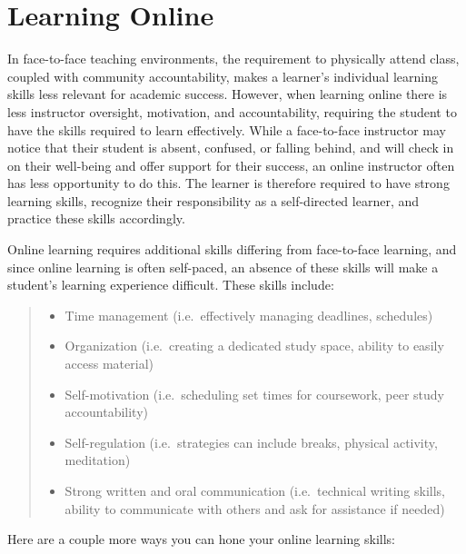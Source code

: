 \documentclass[
]{book}
\providecommand{\tightlist}{%
  \setlength{\itemsep}{0pt}\setlength{\parskip}{0pt}}
\theoremstyle{definition}
\theoremstyle{definition}
\theoremstyle{definition}
\theoremstyle{definition}
\theoremstyle{remark}
\begin{document}
\hypertarget{learning-online}{%
\section{Learning Online}\label{learning-online}}

In face-to-face teaching environments, the requirement to physically attend class, coupled with community accountability, makes a learner's individual learning skills less relevant for academic success. However, when learning online there is less instructor oversight, motivation, and accountability, requiring the student to have the skills required to learn effectively. While a face-to-face instructor may notice that their student is absent, confused, or falling behind, and will check in on their well-being and offer support for their success, an online instructor often has less opportunity to do this. The learner is therefore required to have strong learning skills, recognize their responsibility as a self-directed learner, and practice these skills accordingly.

Online learning requires additional skills differing from face-to-face learning, and since online learning is often self-paced, an absence of these skills will make a student's learning experience difficult. These skills include:

\begin{quote}
\begin{itemize}
\tightlist
\item
  Time management (i.e.~effectively managing deadlines, schedules)\\
\item
  Organization (i.e.~creating a dedicated study space, ability to easily access material)\\
\item
  Self-motivation (i.e.~scheduling set times for coursework, peer study accountability)\\
\item
  Self-regulation (i.e.~strategies can include breaks, physical activity, meditation)\\
\item
  Strong written and oral communication (i.e.~technical writing skills, ability to communicate with others and ask for assistance if needed) \citep{crozierLearningLearnOnline2020}
\end{itemize}
\end{quote}

Here are a couple more ways you can hone your online learning skills:
\end{document}
